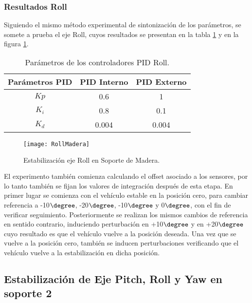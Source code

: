 \documentclass[../main.tex]{subfiles}
\begin{document}
\subsubsection{Resultados Roll}

Siguiendo el mismo método experimental de sintonización de los parámetros,
se somete a prueba el eje Roll, cuyos resultados se presentan en la tabla \ref{table: Parametros Roll Ma} y en la figura \ref{fig: Resultados Roll Grafico Ma}.

\begin{table}[H]
\noindent \begin{centering}
\begin{tabular}{|c|c|c|}
\hline 
Parámetros PID & PID Interno & PID Externo\tabularnewline
\hline 
\hline 
$Kp$ & 0.6 & 1\tabularnewline
\hline 
$K_{i}$ & 0.8 & 0.1\tabularnewline
\hline 
$K_{d}$ & 0.004 & 0.004\tabularnewline
\hline 
\end{tabular}
\par\end{centering}
\caption{Parámetros de los controladores PID Roll.}\label{table: Parametros Roll Ma}\noindent
\end{table}

\begin{figure}[H]
\noindent \begin{centering}
\texttt{[image: RollMadera]}
\par\end{centering}
\caption{Estabilización eje Roll en Soporte de Madera.}\label{fig: Resultados Roll Grafico Ma}\noindent
\end{figure}

El experimento también comienza calculando el offset asociado a los
sensores, por lo tanto también se fijan los valores de integración
después de esta etapa. En primer lugar se comienza con el vehículo
estable en la posición cero, para cambiar referencia a -10$\degree$, 
-20$\degree$, -10$\degree$ y 0$\degree$,
con el fin de verificar seguimiento. Posteriormente se realizan los
mismos cambios de referencia en sentido contrario, induciendo perturbación
en +10$\degree$ y en +20$\degree$ cuyo
resultado es que el vehículo vuelve a la posición deseada. Una vez
que se vuelve a la posición cero, también se inducen perturbaciones
verificando que el vehículo vuelve a la estabilización en dicha posición.


\subsection{Estabilización de Eje Pitch, Roll y Yaw en soporte 2}
\end{document}
